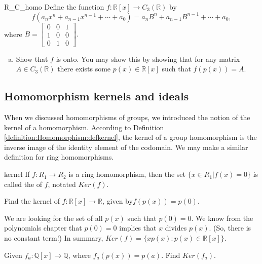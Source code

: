 \begin{exercise}{R_C_homo}
Define the function $f:{\mathbb R}[x]\rightarrow C_3({\mathbb R})$ by
\[f(a_nx^n+a_{n-1}x^{n-1}+\cdots +a_0)=a_nB^n+a_{n-1}B^{n-1}+\cdots +a_0,\] 
where $B=
\begin{bmatrix}
0 & 0 & 1\\
1 & 0 & 0\\
0 & 1 & 0
\end{bmatrix}.$

\begin{enumerate}[(a)]
\item Show that $f$ is onto.  You may show this by showing that for any matrix $A\in C_3({\mathbb R})$ there exists some $p(x)\in {\mathbb R}[x]$ such that $f(p(x))=A$.
\end{enumerate}
\end{exercise}



\subsection{Homomorphism kernels and ideals}
\label{subsec:Rings:RingHomomorphismKernelsIdeals:KernalAndIdeals}

When we discussed homomorphisms of groups, we introduced the notion of the kernel of a homomorphism.  According to Definition \ref{definition:Homomorphism:defkernel}, the kernel of a group homomorphism is the inverse image of the identity element of the codomain.  We may make a similar definition for ring homomorphisms.  

\begin{defn}{kernel}
If $f:R_1\rightarrow R_2$ is a ring homomorphism, then the set $\{x\in R_1|f(x)=0\}$ is called the  of $f$, notated $Ker(f)$.
\end{defn}

\begin{example}{}
Find the kernel of $f:{\mathbb R}[x]\rightarrow{\mathbb R}$, given by$f(p(x))=p(0)$.

We are looking for the set of all $p(x)$ such that $p(0)=0$. 
We know from the polynomials chapter that $p(0)=0$ implies that $x$ divides $p(x)$.  (So, there is no constant term!)  In summary, $Ker(f)=\{xp(x): p(x)\in{\mathbb R}[x]\}$.
\end{example}

\begin{exercise}{}
Given $f_a:{\mathbb Q}[x]\rightarrow{\mathbb Q}$, where $f_a(p(x))=p(a)$.  Find $Ker(f_a)$.
\end{exercise}

